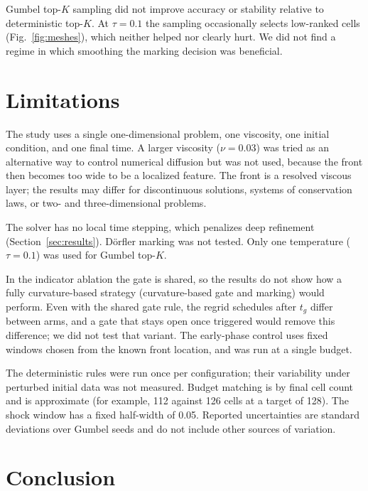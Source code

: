 \documentclass[conference]{IEEEtran}
\begin{document}
Gumbel top-$K$ sampling did not improve accuracy or stability relative to deterministic top-$K$. At $\tau = 0.1$ the sampling occasionally selects low-ranked cells (Fig.~\ref{fig:meshes}), which neither helped nor clearly hurt. We did not find a regime in which smoothing the marking decision was beneficial.

\section{Limitations}
\label{sec:limitations}

The study uses a single one-dimensional problem, one viscosity, one initial condition, and one final time. A larger viscosity ($\nu = 0.03$) was tried as an alternative way to control numerical diffusion but was not used, because the front then becomes too wide to be a localized feature. The front is a resolved viscous layer; the results may differ for discontinuous solutions, systems of conservation laws, or two- and three-dimensional problems.

The solver has no local time stepping, which penalizes deep refinement (Section~\ref{sec:results}). D\"orfler marking \cite{dorfler1996} was not tested. Only one temperature ($\tau = 0.1$) was used for Gumbel top-$K$.

In the indicator ablation the gate is shared, so the results do not show how a fully curvature-based strategy (curvature-based gate and marking) would perform. Even with the shared gate rule, the regrid schedules after $t_g$ differ between arms, and a gate that stays open once triggered would remove this difference; we did not test that variant. The early-phase control uses fixed windows chosen from the known front location, and was run at a single budget.

The deterministic rules were run once per configuration; their variability under perturbed initial data was not measured. Budget matching is by final cell count and is approximate (for example, 112 against 126 cells at a target of 128). The shock window has a fixed half-width of 0.05. Reported uncertainties are standard deviations over Gumbel seeds and do not include other sources of variation.

\section{Conclusion}
\label{sec:conclusion}
\end{document}

